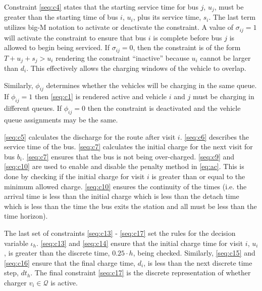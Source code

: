 \documentclass[ee,msthesis]{usuthesis}
\newcommand{\Qset}{\mathcal{Q}}             %
\begin{document}
Constraint \ref{seq:c4} states that the starting service time for bus \(j\), \(u_j\), must be greater than the starting time
of bus \(i\), \(u_i\), plus its service time, \(s_i\). The last term utilizes big-M notation to activate or deactivate the
constraint. A value of \(\sigma_{ij} = 1\) will activate the constraint to ensure that bus \(i\) is complete before bus \(j\) is
allowed to begin being serviced. If \(\sigma_{ij} = 0\), then the constraint is of the form \(T + u_j + s_j > u_i\) rendering the
constraint ``inactive'' because \(u_i\) cannot be larger than \(d_i\). This effectively allows the charging windows of the
vehicle to overlap.

Similarly, \(\phi_{ij}\) determines whether the vehicles will be charging in the same queue. If \(\phi_{ij} = 1\) then
\eqref{seq:c1} is rendered active and vehicle \(i\) and \(j\) must be charging in different queues. If \(\phi_{ij} = 0\) then the
constraint is deactivated and the vehicle queue assignments may be the same.

\ref{seq:c5} calculates the discharge for the route after visit \(i\). \ref{seq:c6} describes the service time of the bus.
\ref{seq:c7} calculates the initial charge for the next visit for bus \(b_i\). \ref{seq:c7} ensures that the bus is not
being over-charged. \ref{seq:c9} and \ref{seq:c10} are used to enable and disable the penalty method in \ref{eq:ac}. This is
done by checking if the initial charge for visit \(i\) is greater than or equal to the minimum allowed charge.
\ref{seq:c10} ensures the continuity of the times (i.e. the arrival time is less than the initial charge which is less
than the detach time which is less than the time the bus exits the station and all must be less than the time horizon).

The last set of constraints \ref{seq:c13} - \ref{seq:c17} set the rules for the decision variable \(\iota_h\). \ref{seq:c13}
and \ref{seq:c14} ensure that the initial charge time for visit \(i\), \(u_i\), is greater than the discrete time, \(0.25 \cdot
h\), being checked. Similarly, \ref{seq:c15} and \ref{seq:c16} ensure that the final charge time, \(d_i\), is less than the
next discrete time step, \(dt_h\). The final constraint \ref{seq:c17} is the discrete representation of whether charger
\(v_i \in \Qset\) is active.
\end{document}
